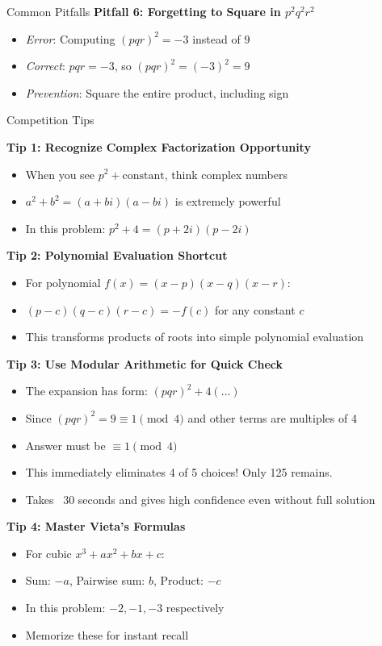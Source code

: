 \documentclass[12pt]{article}
\begin{document}
\begin{warningbox}{Common Pitfalls}
\textbf{Pitfall 6: Forgetting to Square in $p^2q^2r^2$}
\begin{itemize}
    \item \textit{Error}: Computing $(pqr)^2 = -3$ instead of $9$
    \item \textit{Correct}: $pqr = -3$, so $(pqr)^2 = (-3)^2 = 9$
    \item \textit{Prevention}: Square the entire product, including sign
\end{itemize}

\end{warningbox}

\begin{protipbox}{Competition Tips}

\textbf{Tip 1: Recognize Complex Factorization Opportunity}
\begin{itemize}
    \item When you see $p^2 + \text{constant}$, think complex numbers
    \item $a^2 + b^2 = (a + bi)(a - bi)$ is extremely powerful
    \item In this problem: $p^2 + 4 = (p + 2i)(p - 2i)$
\end{itemize}

\textbf{Tip 2: Polynomial Evaluation Shortcut}
\begin{itemize}
    \item For polynomial $f(x) = (x - p)(x - q)(x - r)$:
    \item $(p - c)(q - c)(r - c) = -f(c)$ for any constant $c$
    \item This transforms products of roots into simple polynomial evaluation
\end{itemize}

\textbf{Tip 3: Use Modular Arithmetic for Quick Check}
\begin{itemize}
    \item The expansion has form: $(pqr)^2 + 4(\ldots)$
    \item Since $(pqr)^2 = 9 \equiv 1 \pmod{4}$ and other terms are multiples of 4
    \item Answer must be $\equiv 1 \pmod{4}$
    \item This immediately eliminates 4 of 5 choices! Only 125 remains.
    \item Takes ~30 seconds and gives high confidence even without full solution
\end{itemize}

\textbf{Tip 4: Master Vieta's Formulas}
\begin{itemize}
    \item For cubic $x^3 + ax^2 + bx + c$:
    \item Sum: $-a$, Pairwise sum: $b$, Product: $-c$
    \item In this problem: $-2, -1, -3$ respectively
    \item Memorize these for instant recall
\end{itemize}


\end{protipbox}
\end{document}
